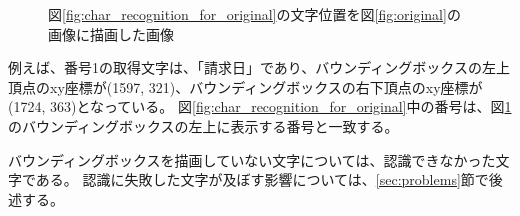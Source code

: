 \begin{figure}[tp]
    \begin{center}
        \caption{図\ref{fig:char_recognition_for_original}の文字位置を図\ref{fig:original}の画像に描画した画像}
        \label{fig:bbox_recognition_for_original}
    \end{center}
\end{figure}

例えば、番号1の取得文字は、「請求日」であり、バウンディングボックスの左上頂点のxy座標が(1597, 321)、バウンディングボックスの右下頂点のxy座標が(1724, 363)となっている。
図\ref{fig:char_recognition_for_original}中の番号は、図\ref{fig:bbox_recognition_for_original}のバウンディングボックスの左上に表示する番号と一致する。

バウンディングボックスを描画していない文字については、認識できなかった文字である。
認識に失敗した文字が及ぼす影響については、\ref{sec:problems}節で後述する。

